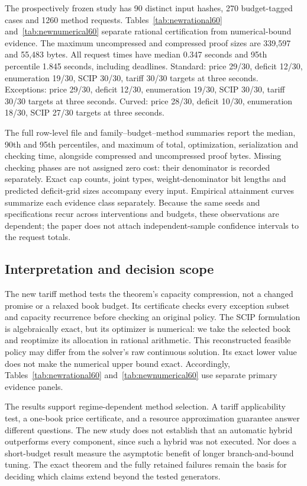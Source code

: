 \documentclass[11pt,letterpaper]{article}
\theoremstyle{definition}\newtheorem{remark}[theorem]{Remark}
\begin{document}
The prospectively frozen study has 90 distinct input hashes, 270 budget-tagged cases and 1260 method requests. Tables~\ref{tab:newrational60} and~\ref{tab:newnumerical60} separate rational certification from numerical-bound evidence. The maximum uncompressed and compressed proof sizes are 339,597 and 55,483 bytes. All request times have median 0.347 seconds and 95th percentile 1.845 seconds, including deadlines. Standard: price 29/30, deficit 12/30, enumeration 19/30, SCIP 30/30, tariff 30/30 targets at three seconds. Exceptions: price 29/30, deficit 12/30, enumeration 19/30, SCIP 30/30, tariff 30/30 targets at three seconds. Curved: price 28/30, deficit 10/30, enumeration 18/30, SCIP 27/30 targets at three seconds. 



The full row-level file and family--budget--method summaries report the median, 90th and 95th percentiles, and maximum of total, optimization, serialization and checking time, alongside compressed and uncompressed proof bytes. Missing checking phases are not assigned zero cost: their denominator is recorded separately. Exact cap counts, joint types, weight-denominator bit lengths and predicted deficit-grid sizes accompany every input. Empirical attainment curves summarize each evidence class separately. Because the same seeds and specifications recur across interventions and budgets, these observations are dependent; the paper does not attach independent-sample confidence intervals to the request totals.

\subsection{Interpretation and decision scope}
The new tariff method tests the theorem's capacity compression, not a changed promise or a relaxed book budget. Its certificate checks every exception subset and capacity recurrence before checking an original policy. The SCIP formulation is algebraically exact, but its optimizer is numerical: we take the selected book and reoptimize its allocation in rational arithmetic. This reconstructed feasible policy may differ from the solver's raw continuous solution. Its exact lower value does not make the numerical upper bound exact. Accordingly, Tables~\ref{tab:newrational60} and~\ref{tab:newnumerical60} use separate primary evidence panels.

The results support regime-dependent method selection. A tariff applicability test, a one-book price certificate, and a resource approximation guarantee answer different questions. The new study does not establish that an automatic hybrid outperforms every component, since such a hybrid was not executed. Nor does a short-budget result measure the asymptotic benefit of longer branch-and-bound tuning. The exact theorem and the fully retained failures remain the basis for deciding which claims extend beyond the tested generators.
\end{document}
